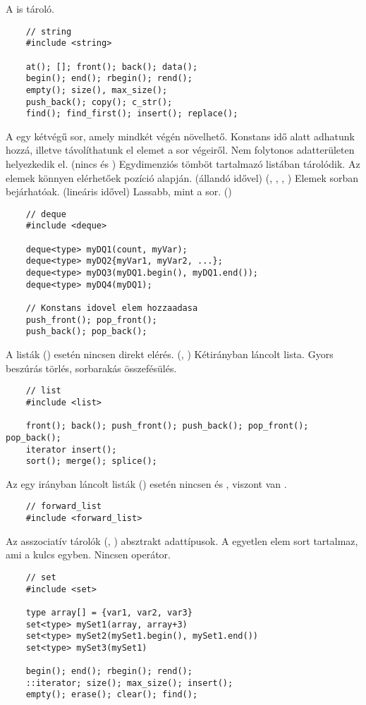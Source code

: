 \documentclass[main.tex]{subfiles}
\begin{document}
  A  is  tároló.
  \begin{lstlisting}
    // string
    #include <string>

    at(); []; front(); back(); data();
    begin(); end(); rbegin(); rend();
    empty(); size(), max_size();
    push_back(); copy(); c_str();
    find(); find_first(); insert(); replace();
  \end{lstlisting}

  A  egy kétvégű sor,
  amely mindkét végén növelhető.
  Konstans idő alatt adhatunk hozzá,
  illetve távolíthatunk el elemet a sor végeiről.
  Nem folytonos adatterületen helyezkedik el.
  (nincs  és )
  Egydimenziós tömböt tartalmazó listában tárolódik.
  Az elemek könnyen elérhetőek pozíció alapján. (állandó idővel)
  (\kkod{[]}, , , )
  Elemek sorban bejárhatóak. (lineáris idővel)
  Lassabb, mint a sor. ()
  
  \vspace{1em}
  \begin{lstlisting}
    // deque
    #include <deque>

    deque<type> myDQ1(count, myVar);
    deque<type> myDQ2{myVar1, myVar2, ...};
    deque<type> myDQ3(myDQ1.begin(), myDQ1.end());
    deque<type> myDQ4(myDQ1);
    
    // Konstans idovel elem hozzaadasa
    push_front(); pop_front();
    push_back(); pop_back();
  \end{lstlisting}
  
  A listák () esetén nincsen direkt elérés.
  (, \kkod{[]}) Kétirányban láncolt lista.
  Gyors beszúrás törlés, sorbarakás összefésülés.
  \begin{lstlisting}
    // list
    #include <list>

    front(); back(); push_front(); push_back(); pop_front(); pop_back();
    iterator insert();
    sort(); merge(); splice();
  \end{lstlisting}
 
  Az egy irányban láncolt listák ()
  esetén nincsen  és
  , viszont van
  .
  \begin{lstlisting}
    // forward_list
    #include <forward_list>
  \end{lstlisting}

  Az asszociatív tárolók (, )
  absztrakt adattípusok.
  A  egyetlen elem sort tartalmaz, ami a kulcs egyben.
  Nincsen \kkod{[]} operátor.
  \begin{lstlisting}
    // set
    #include <set>

    type array[] = {var1, var2, var3}
    set<type> mySet1(array, array+3)
    set<type> mySet2(mySet1.begin(), mySet1.end())
    set<type> mySet3(mySet1)

    begin(); end(); rbegin(); rend();
    ::iterator; size(); max_size(); insert();
    empty(); erase(); clear(); find();
  \end{lstlisting}
\end{document}
